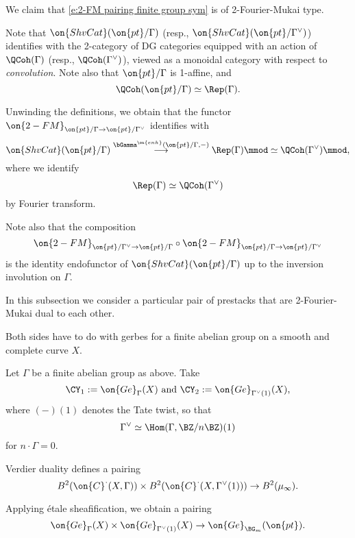 \documentclass[9pt]{amsart}
\theoremstyle{remark}
\theoremstyle{definition}
\theoremstyle{remark}
\numberwithin{equation}{section}
\begin{document}
We claim that \eqref{e:2-FM pairing finite group sym} is of 2-Fourier-Mukai type. 

\medskip

Note that $\on{ShvCat}(\on{pt}/\Gamma)$ (resp., $\on{ShvCat}(\on{pt}/\Gamma^\vee)$) 
identifies with the 2-category of DG categories equipped with an action of $\QCoh(\Gamma)$ (resp., $\QCoh(\Gamma^\vee)$),
viewed as a monoidal category with respect to \emph{convolution}. Note also that $\on{pt}/\Gamma$ is 1-affine, and
$$\QCoh(\on{pt}/\Gamma)\simeq \Rep(\Gamma).$$

Unwinding the definitions, we obtain that the functor $\on{2-FM}_{\on{pt}/\Gamma\to \on{pt}/\Gamma^\vee}$ 
identifies with 
$$\on{ShvCat}(\on{pt}/\Gamma) \overset{\bGamma^{\on{enh}}(\on{pt}/\Gamma,-)}\longrightarrow
\Rep(\Gamma)\mmod\simeq \QCoh(\Gamma^\vee)\mmod,$$
where we identify 
$$\Rep(\Gamma) \simeq \QCoh(\Gamma^\vee)$$
by Fourier transform. 

\medskip

Note also that the composition
$$\on{2-FM}_{\on{pt}/\Gamma^\vee\to \on{pt}/\Gamma}\circ \on{2-FM}_{\on{pt}/\Gamma\to \on{pt}/\Gamma^\vee}$$
is the identity endofunctor of $\on{ShvCat}(\on{pt}/\Gamma)$ up to the inversion involution on $\Gamma$. 

 \label{ss:FM and Verdier}

In this subsection we consider a particular pair of prestacks that are 2-Fourier-Mukai dual to each
other. 

\medskip

Both sides have to do with gerbes for a finite abelian group on a smooth and complete curve $X$. 

\sssec{}

Let $\Gamma$ be a finite abelian group as above. Take
$$\CY_1:=\on{Ge}_{\Gamma}(X) \text{ and } \CY_2:=\on{Ge}_{\Gamma^\vee(1)}(X),$$
where $(-)(1)$ denotes the Tate twist, so that 
$$\Gamma^\vee \simeq \Hom(\Gamma,\BZ/n\BZ)(1)$$
for $n\cdot \Gamma = 0$.

\medskip

Verdier duality defines a pairing
$$B^2(\on{C}^\cdot(X,\Gamma))\times B^2(\on{C}^\cdot(X,\Gamma^\vee(1)))\to B^2(\mu_\infty).$$

Applying \'etale sheafification, we obtain a pairing
\begin{equation} \label{e:Verdier pairing Gamma}
\on{Ge}_{\Gamma}(X)\times \on{Ge}_{\Gamma^\vee(1)}(X)\to \on{Ge}_{\BG_m}(\on{pt}).
\end{equation} 
\end{document}
